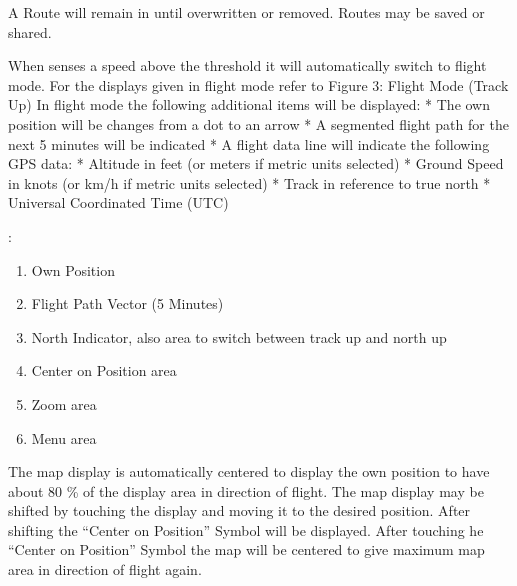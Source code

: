 \documentclass[letterpaper,10pt,english]{sphinxmanual}
\begin{document}
\sphinxAtStartPar
A Route will remain in  until overwritten or
removed. Routes may be saved or shared.

\sphinxAtStartPar
{}

\sphinxAtStartPar
When  senses a speed above the threshold it will
automatically switch to flight mode.  For the displays given in flight mode
refer to Figure 3: Flight Mode (Track Up) In flight mode the following
additional items will be displayed:
* The own position will be changes from a dot to an arrow
* A segmented flight path for the next 5 minutes will be indicated
* A flight data line will indicate the following GPS data:
* Altitude in feet (or meters if metric units selected)
* Ground Speed in knots (or km/h if metric units selected)
* Track in reference to true north
* Universal Coordinated Time (UTC)

\begin{figure}[htbp]
\centering

\noindent{}
\end{figure}

\sphinxAtStartPar
{}:
\begin{enumerate}
%
\item {} 
\sphinxAtStartPar
Own Position

\item {} 
\sphinxAtStartPar
Flight Path Vector (5 Minutes)

\item {} 
\sphinxAtStartPar
North Indicator, also area to switch between track up and north up

\item {} 
\sphinxAtStartPar
Center on Position area

\item {} 
\sphinxAtStartPar
Zoom area

\item {} 
\sphinxAtStartPar
Menu area

\end{enumerate}

\sphinxAtStartPar
The  map display is automatically centered to
display the own position to have about 80 \% of the display area in direction of
flight.  The map display may be shifted by touching the display and moving it to
the desired position. After shifting the “Center on Position” Symbol will be
displayed. After touching he “Center on Position” Symbol the map will be
centered to give maximum map area in direction of flight again.
\end{document}
